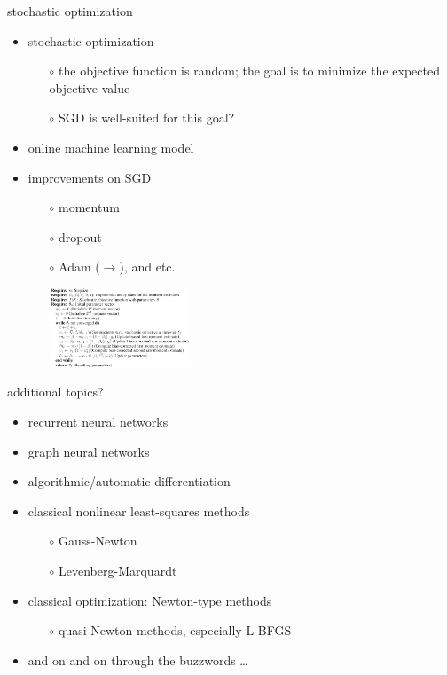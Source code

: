 \documentclass[xcolor={svgnames},
               hyperref={colorlinks,citecolor=DeepPink4,linkcolor=FireBrick,urlcolor=Maroon}]
               {beamer}
\begin{document}
\begin{frame}{stochastic optimization}

\begin{itemize}
\item stochastic optimization
    \begin{itemize}
    \item[$\circ$] the objective function is random; the goal is to minimize the expected objective value
    \item[$\circ$] SGD is well-suited for this goal?
    \end{itemize}
\item online machine learning model
\item improvements on SGD
    \begin{itemize}
    \item[$\circ$] momentum
    \item[$\circ$] dropout
    \item[$\circ$] Adam ($\rightarrow$), and etc.

\hfill \includegraphics[width=0.35\textwidth]{figs/adam}
    \end{itemize}
\end{itemize}
\end{frame}


\begin{frame}{additional topics?}

\begin{itemize}
\item recurrent neural networks
\item graph neural networks
\item algorithmic/automatic differentiation
\item classical nonlinear least-squares methods
    \begin{itemize}
    \item[$\circ$] Gauss-Newton
    \item[$\circ$] Levenberg-Marquardt
    \end{itemize}
\item classical optimization: Newton-type methods
    \begin{itemize}
    \item[$\circ$] quasi-Newton methods, especially L-BFGS
    \end{itemize}
\item and on and on through the buzzwords \dots
\end{itemize}
\end{frame}
\end{document}
